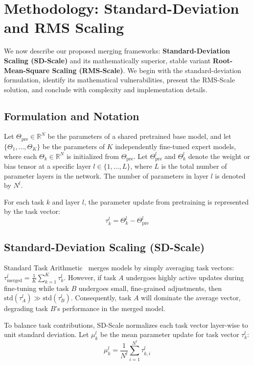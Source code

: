 \section{Methodology: Standard-Deviation and RMS Scaling}
\label{submission:sec:method}

We now describe our proposed merging frameworks: \textbf{Standard-Deviation Scaling (SD-Scale)} and its mathematically superior, stable variant \textbf{Root-Mean-Square Scaling (RMS-Scale)}. We begin with the standard-deviation formulation, identify its mathematical vulnerabilities, present the RMS-Scale solution, and conclude with complexity and implementation details.

\subsection{Formulation and Notation}
Let $\Theta_{\text{pre}} \in \mathbb{R}^N$ be the parameters of a shared pretrained base model, and let $\{\Theta_1, \dots, \Theta_K\}$ be the parameters of $K$ independently fine-tuned expert models, where each $\Theta_k \in \mathbb{R}^N$ is initialized from $\Theta_{\text{pre}}$. Let $\Theta_{\text{pre}}^l$ and $\Theta_k^l$ denote the weight or bias tensor at a specific layer $l \in \{1, \dots, L\}$, where $L$ is the total number of parameter layers in the network. The number of parameters in layer $l$ is denoted by $N^l$.

For each task $k$ and layer $l$, the parameter update from pretraining is represented by the task vector:
\begin{equation}
\tau_k^l = \Theta_k^l - \Theta_{\text{pre}}^l
\end{equation}

\subsection{Standard-Deviation Scaling (SD-Scale)}
Standard Task Arithmetic~\cite{ilharco2022editing} merges models by simply averaging task vectors: $\tau_{\text{merged}}^l = \frac{1}{K}\sum_{k=1}^K \tau_k^l$. However, if task $A$ undergoes highly active updates during fine-tuning while task $B$ undergoes small, fine-grained adjustments, then $\text{std}(\tau_A^l) \gg \text{std}(\tau_B^l)$. Consequently, task $A$ will dominate the average vector, degrading task $B$'s performance in the merged model.

To balance task contributions, SD-Scale normalizes each task vector layer-wise to unit standard deviation. Let $\mu_k^l$ be the mean parameter update for task vector $\tau_k^l$:
\begin{equation}
\mu_k^l = \frac{1}{N^l} \sum_{i=1}^{N^l} \tau_{k, i}^l
\end{equation}

